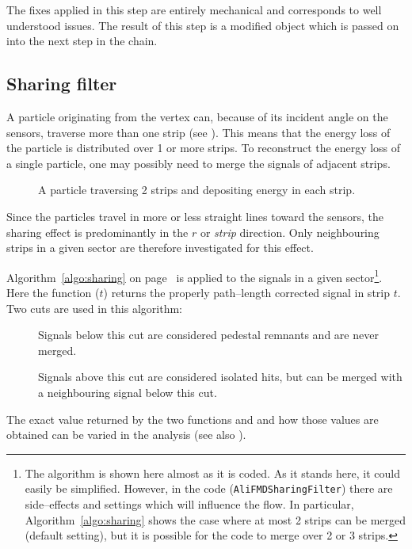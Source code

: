 The fixes applied in this step are entirely mechanical and corresponds
to well understood issues.  The result of this step is a modified
\ESD{} object which is passed on into the next step in the chain. 


\subsection{Sharing filter}
\label{sec:sub:sharing_filter}

A particle originating from the vertex can, because of its incident
angle on the \FMD{} sensors, traverse more than one strip (see
).  This means that the energy loss of the
particle is distributed over 1 or more strips.  To reconstruct the
energy loss of a single particle, one may possibly need to merge the
signals of adjacent strips.

\begin{figure}[htbp]
  \centering
  \caption{A particle traversing 2 strips and depositing energy in
    each strip. }
  \label{fig:share_fraction}
\end{figure}

\iffalse
The effect is most pronounced in low--flux\footnote{Events with a low
  hit density.} events, like proton--proton collisions or peripheral
Pb--Pb collisions, while in high--flux events the hit density is so
high that most likely each and every strip will be hit and the effect
cancels out on average.
\fi

Since the particles travel in more or less straight lines toward the
\FMD{} sensors, the sharing effect is predominantly in the $r$ or
\emph{strip} direction.  Only neighbouring strips in a given sector are
therefore investigated for this effect.  

Algorithm~\ref{algo:sharing} on page~\pageref{algo:sharing} is applied to
the signals in a given sector\footnote{The algorithm is shown here
  almost as it is coded.  As it stands here, it could easily be
  simplified.  However, in the code (\texttt{AliFMDSharingFilter})
  there are side--effects and settings which will influence the
  flow. In particular, Algorithm~\ref{algo:sharing} shows the case
  where at most 2 strips can be merged (default setting), but it is
  possible for the code to merge over 2 or 3 strips.}. Here the
function ($t$) returns the properly
path--length corrected signal in strip $t$.  Two cuts are used in this
algorithm:
\begin{description}
\item[] Signals below this cut are considered
  pedestal remnants and are never merged. 
\item[] Signals above this cut are considered
  isolated hits, but can be merged with a neighbouring signal below
  this cut. 
\end{description}
The exact value returned by the two functions  and
 and how those values are obtained can be varied
in the analysis (see also ).


